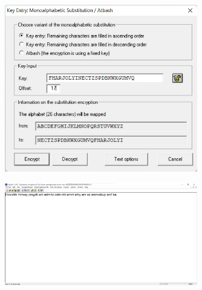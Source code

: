 \documentclass{article}
\begin{document}
\begin{figure}[H]
    \centering
    \includegraphics[width=0.75\textwidth]{figures/2b.jpg}
    \caption
	{}
    \label{fig:fig1}
\end{figure}

\begin{figure}[H]
    \centering
    \includegraphics[width=0.75\textwidth]{figures/2c.jpg}
    \caption
	{}
    \label{fig:fig1}
\end{figure}


\subsection{}%
\end{document}
